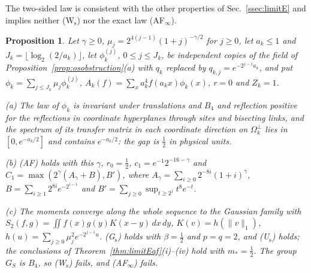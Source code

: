 \documentclass[aps,prd,twocolumn,superscriptaddress,nofootinbib,longbibliography,floatfix,amsmath,amssymb,10pt]{revtex4-2}
\newtheorem{proposition}[theorem]{Proposition}
\theoremstyle{definition}
\theoremstyle{remark}
\begin{document}
The two-sided law is consistent with the other properties of
Sec.~\ref{ssec:limitE} and implies neither (W$_{\mathrm s}$) nor the exact
law (AF$_\infty$).

\begin{proposition}\label{prop:limitEafexample}
Let $\gamma\ge0$, $\mu_j=2^{4(j-1)}(1+j)^{-\gamma/2}$ for $j\ge0$, let
$a_k\le1$ and $J_k=\lfloor\log_2(2/a_k)\rfloor$, let $\phi^{(j)}_k$,
$0\le j\le J_k$, be independent copies of the field of
Proposition~\textup{\ref{prop:osobstruction}(a)} with $q_k$ replaced by
$q_{k,j}=e^{-2^{j-1}a_k}$, and put $\phi_k=\sum_{j\le J_k}\mu_j\phi^{(j)}_k$,
$A_k(f)=\sum_xa_k^4f(a_kx)\phi_k(x)$, $r=0$ and $Z_k=1$.

\textup{(a)} The law of $\phi_k$ is invariant under translations and $B_4$
and reflection positive for the reflections in coordinate hyperplanes
through sites and bisecting links, and the spectrum of its transfer matrix
in each coordinate direction on $\Omega_k^\perp$ lies in $[0,e^{-a_k/2}]$
and contains $e^{-a_k/2}$: the gap is $\frac12$ in physical units.

\textup{(b)} \textup{(AF)} holds with this $\gamma$, $r_0=\frac12$,
$c_1=e^{-1}2^{-16-\gamma}$ and $C_1=\max(2^\gamma(A_\gamma+B),B')$, where
$A_\gamma=\sum_{i\ge0}2^{-8i}(1+i)^\gamma$, $B=\sum_{i\ge1}2^{8i}e^{-2^{i-1}}$
and $B'=\sum_{j\ge0}\sup_{t\ge2^j}t^8e^{-t}$.

\textup{(c)} The moments converge along the whole sequence to the Gaussian
family with $S_2(f,g)=\iint f(x)g(y)K(x-y)\,dx\,dy$, $K(v)=h(\|v\|_1)$,
$h(u)=\sum_{j\ge0}\mu_j^2e^{-2^{j-1}u}$. \textup{(G$_{\mathrm s}$)} holds with
$\beta=\frac12$ and $p=q=2$, and \textup{(U$_{\mathrm s}$)} holds; the
conclusions of Theorem~\textup{\ref{thm:limitEaf}}(i)--(iv) hold with
$m_*=\frac12$. The group $G_S$ is $B_4$, so \textup{(W$_{\mathrm s}$)}
fails, and \textup{(AF$_\infty$)} fails.
\end{proposition}
\end{document}
